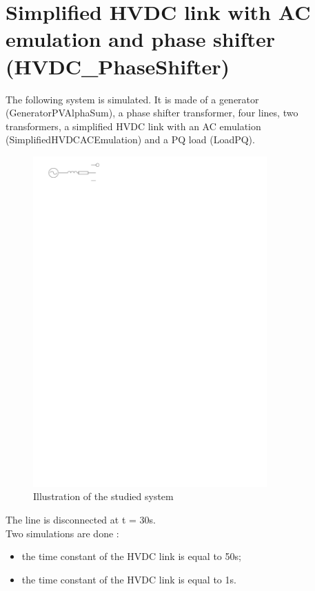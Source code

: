 \documentclass[a4paper, 12pt]{report}
\begin{document}
\section*{Simplified HVDC link with AC emulation and phase shifter (HVDC\_PhaseShifter)}

The following system is simulated. It is made of a generator (GeneratorPVAlphaSum), a phase shifter transformer, four lines, two transformers, a simplified HVDC link with an AC emulation (SimplifiedHVDCACEmulation) and a PQ load (LoadPQ).\\

\begin{figure}[H]
  \begin{center}
  \includegraphics[width=0.8\textwidth]{HVDC_PhaseShifter/HVDC_PhaseShifter}
  \end{center}
  \caption{Illustration of the studied system}
\end{figure}

The line is disconnected at t = 30s.\\
Two simulations are done :
\begin{itemize}
\item the time constant of the HVDC link is equal to 50s;
\item the time constant of the HVDC link is equal to 1s.
\end{itemize}
\end{document}
